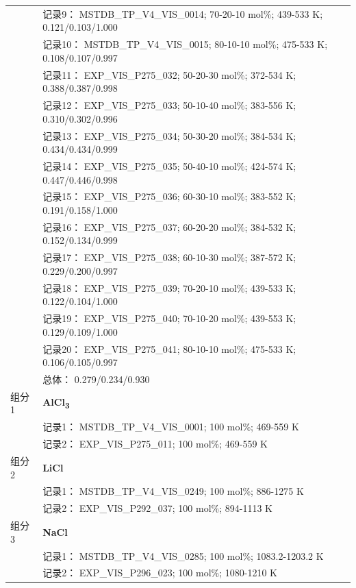 \documentclass[12pt]{article}
\begin{document}
{\begin{longtable}[]{@{}
  >{\raggedright\arraybackslash}p{}
  >{\raggedright\arraybackslash}p{}@{}}
 & 记录9： MSTDB\_TP\_V4\_VIS\_0014; 70-20-10 mol\%; 439-533 K; 0.121/0.103/1.000 \\
 & 记录10： MSTDB\_TP\_V4\_VIS\_0015; 80-10-10 mol\%; 475-533 K; 0.108/0.107/0.997 \\
 & 记录11： EXP\_VIS\_P275\_032; 50-20-30 mol\%; 372-534 K; 0.388/0.387/0.998 \\
 & 记录12： EXP\_VIS\_P275\_033; 50-10-40 mol\%; 383-556 K; 0.310/0.302/0.996 \\
 & 记录13： EXP\_VIS\_P275\_034; 50-30-20 mol\%; 384-534 K; 0.434/0.434/0.999 \\
 & 记录14： EXP\_VIS\_P275\_035; 50-40-10 mol\%; 424-574 K; 0.447/0.446/0.998 \\
 & 记录15： EXP\_VIS\_P275\_036; 60-30-10 mol\%; 383-552 K; 0.191/0.158/1.000 \\
 & 记录16： EXP\_VIS\_P275\_037; 60-20-20 mol\%; 384-532 K; 0.152/0.134/0.999 \\
 & 记录17： EXP\_VIS\_P275\_038; 60-10-30 mol\%; 387-572 K; 0.229/0.200/0.997 \\
 & 记录18： EXP\_VIS\_P275\_039; 70-20-10 mol\%; 439-533 K; 0.122/0.104/1.000 \\
 & 记录19： EXP\_VIS\_P275\_040; 70-10-20 mol\%; 439-553 K; 0.129/0.109/1.000 \\
 & 记录20： EXP\_VIS\_P275\_041; 80-10-10 mol\%; 475-533 K; 0.106/0.105/0.997 \\
 & 总体： 0.279/0.234/0.930  \\

组分 1  & \textbf{AlCl\textsubscript{3}} \\
 & 记录1： MSTDB\_TP\_V4\_VIS\_0001; 100 mol\%; 469-559 K \\
 & 记录2： EXP\_VIS\_P275\_011; 100 mol\%; 469-559 K  \\

组分 2  & \textbf{LiCl} \\
 & 记录1： MSTDB\_TP\_V4\_VIS\_0249; 100 mol\%; 886-1275 K \\
 & 记录2： EXP\_VIS\_P292\_037; 100 mol\%; 894-1113 K  \\

组分 3  & \textbf{NaCl} \\
 & 记录1： MSTDB\_TP\_V4\_VIS\_0285; 100 mol\%; 1083.2-1203.2 K \\
 & 记录2： EXP\_VIS\_P296\_023; 100 mol\%; 1080-1210 K  \\


\end{longtable}}
\end{document}
